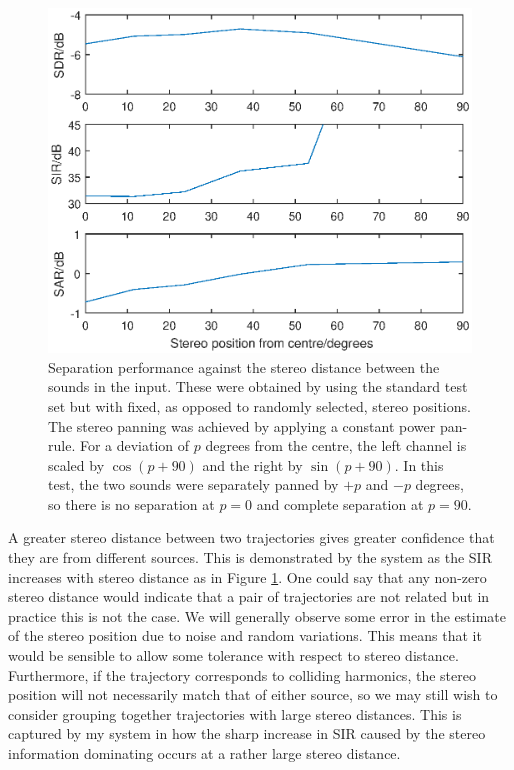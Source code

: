 \documentclass[12pt,a4paper,twoside,openright]{report}
\begin{document}
\begin{figure}
\centering
\includegraphics[width=0.7\linewidth]{./StereoPlots}
\caption[Separation performance against the stereo distance between the sounds in the input.]{{\color{red}Separation performance against the stereo distance between the sounds in the input. These were obtained by using the standard test set but with fixed, as opposed to randomly selected, stereo positions. The stereo panning was achieved by applying a constant power pan-rule. For a deviation of $ p $ degrees from the centre, the left channel is scaled by $ \cos(p+90) $ and the right by $ \sin(p+90) $. In this test, the two sounds were separately panned by $ +p $ and $ -p $ degrees, so there is no separation at $ p=0 $ and complete separation at $ p=90 $.}}
\label{fig:StereoPlots}
\end{figure}


A greater stereo distance between two trajectories gives greater confidence that they are from different sources. This is demonstrated by the system as the SIR increases with stereo distance as in Figure \ref{fig:StereoPlots}. One could say that any non-zero stereo distance would indicate that a pair of trajectories are not related but in practice this is not the case. We will generally observe some error in the estimate of the stereo position due to noise and random variations. This means that it would be sensible to allow some tolerance with respect to stereo distance. Furthermore, if the trajectory corresponds to colliding harmonics, the stereo position will not necessarily match that of either source, so we may still wish to consider grouping together trajectories with large stereo distances. This is captured by my system in how the sharp increase in SIR caused by the stereo information dominating occurs at a rather large stereo distance.
\end{document}
